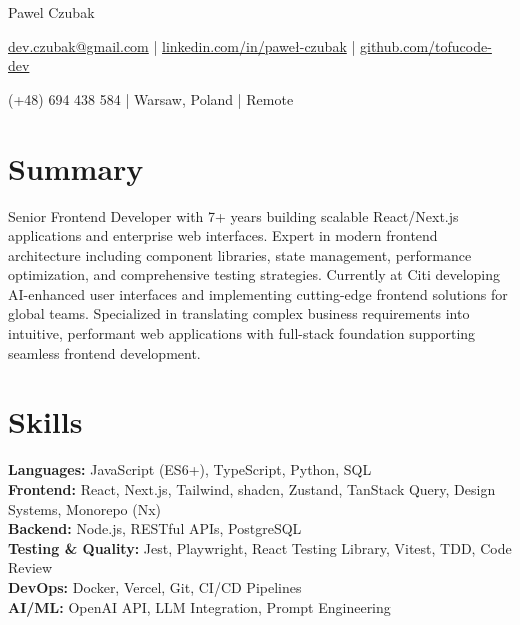 \documentclass[10pt]{article}       %
\begin{document}
\centerline{\Huge Pawel Czubak}

\vspace{3pt}

\centerline{\href{mailto:dev.czubak@gmail.com}{dev.czubak@gmail.com} | \href{https://linkedin.com/in/paweł-czubak}{linkedin.com/in/paweł-czubak} | \href{https://github.com/tofucode-dev}{github.com/tofucode-dev}}
\centerline{(+48) 694 438 584 | Warsaw, Poland | Remote}

\vspace{-10pt}

\section*{Summary}
Senior Frontend Developer with 7+ years building scalable React/Next.js applications and enterprise web interfaces. Expert in modern frontend architecture including component libraries, state management, performance optimization, and comprehensive testing strategies. Currently at Citi developing AI-enhanced user interfaces and implementing cutting-edge frontend solutions for global teams. Specialized in translating complex business requirements into intuitive, performant web applications with full-stack foundation supporting seamless frontend development.

\vspace{-10pt}

\section*{Skills}
\textbf{Languages:} JavaScript (ES6+), TypeScript, Python, SQL \\
\textbf{Frontend:}  React, Next.js, Tailwind, shadcn, Zustand, TanStack Query, Design Systems, Monorepo (Nx) \\
\textbf{Backend:} Node.js, RESTful APIs, PostgreSQL \\
\textbf{Testing \& Quality:} Jest, Playwright, React Testing Library, Vitest, TDD, Code Review \\
\textbf{DevOps:} Docker, Vercel, Git, CI/CD Pipelines \\
\textbf{AI/ML:} OpenAI API, LLM Integration, Prompt Engineering

\vspace{-10pt}

\end{document}
